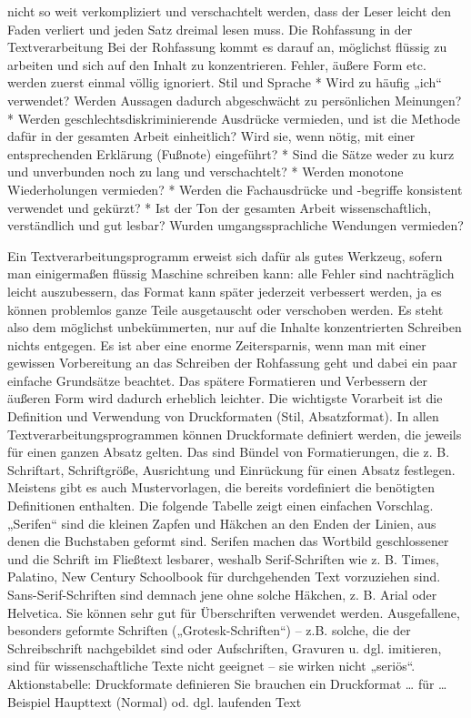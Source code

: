\documentclass[]{book}
\theoremstyle{definition}
\theoremstyle{definition}
\theoremstyle{definition}
\theoremstyle{remark}
\begin{document}
nicht so weit verkompliziert und verschachtelt werden, dass der Leser
leicht den Faden verliert und jeden Satz dreimal lesen muss. Die
Rohfassung in der Textverarbeitung Bei der Rohfassung kommt es darauf
an, möglichst flüssig zu arbeiten und sich auf den Inhalt zu
konzentrieren. Fehler, äußere Form etc. werden zuerst einmal völlig
ignoriert. Stil und Sprache * Wird zu häufig „ich`` verwendet? Werden
Aussagen dadurch abgeschwächt zu persönlichen Meinungen? * Werden
geschlechtsdiskriminierende Ausdrücke vermieden, und ist die Methode
dafür in der gesamten Arbeit einheitlich? Wird sie, wenn nötig, mit
einer entsprechenden Erklärung (Fußnote) eingeführt? * Sind die Sätze
weder zu kurz und unverbunden noch zu lang und verschachtelt? * Werden
monotone Wiederholungen vermieden? * Werden die Fachausdrücke und
-begriffe konsistent verwendet und gekürzt? * Ist der Ton der gesamten
Arbeit wissenschaftlich, verständlich und gut lesbar? Wurden
umgangssprachliche Wendungen vermieden?

Ein Textverarbeitungsprogramm erweist sich dafür als gutes Werkzeug,
sofern man einigermaßen flüssig Maschine schreiben kann: alle Fehler
sind nachträglich leicht auszubessern, das Format kann später jederzeit
verbessert werden, ja es können problemlos ganze Teile ausgetauscht oder
verschoben werden. Es steht also dem möglichst unbekümmerten, nur auf
die Inhalte konzentrierten Schreiben nichts entgegen. Es ist aber eine
enorme Zeitersparnis, wenn man mit einer gewissen Vorbereitung an das
Schreiben der Rohfassung geht und dabei ein paar einfache Grundsätze
beachtet. Das spätere Formatieren und Verbessern der äußeren Form wird
dadurch erheblich leichter. Die wichtigste Vorarbeit ist die Definition
und Verwendung von Druckformaten (Stil, Absatzformat). In allen
Textverarbeitungsprogrammen können Druckformate definiert werden, die
jeweils für einen ganzen Absatz gelten. Das sind Bündel von
Formatierungen, die z. B. Schriftart, Schriftgröße, Ausrichtung und
Einrückung für einen Absatz festlegen. Meistens gibt es auch
Mustervorlagen, die bereits vordefiniert die benötigten Definitionen
enthalten. Die folgende Tabelle zeigt einen einfachen Vorschlag.
„Serifen`` sind die kleinen Zapfen und Häkchen an den Enden der Linien,
aus denen die Buchstaben geformt sind. Serifen machen das Wortbild
geschlossener und die Schrift im Fließtext lesbarer, weshalb
Serif-Schriften wie z. B. Times, Palatino, New Century Schoolbook für
durchgehenden Text vorzuziehen sind. Sans-Serif-Schriften sind demnach
jene ohne solche Häkchen, z. B. Arial oder Helvetica. Sie können sehr
gut für Überschriften verwendet werden. Ausgefallene, besonders geformte
Schriften („Grotesk-Schriften``) -- z.B. solche, die der Schreibschrift
nachgebildet sind oder Aufschriften, Gravuren u. dgl. imitieren, sind
für wissenschaftliche Texte nicht geeignet -- sie wirken nicht
„seriös``.\\
Aktionstabelle: Druckformate definieren Sie brauchen ein Druckformat
\ldots{} für \ldots{} Beispiel Haupttext (Normal) od. dgl. laufenden
Text
\end{document}
